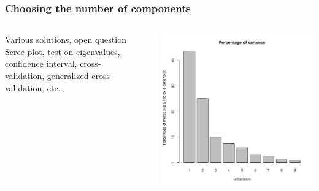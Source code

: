 \documentclass{beamer}\usepackage[]{graphicx}\usepackage[]{color}
\begin{document}
\begin{frame}
  \frametitle{Choosing the number of components}

  \begin{columns}
  \begin{column}{0.68\textwidth}
    \begin{block}{Various solutions, open question}
    Scree plot, test on eigenvalues, confidence interval, cross-validation, generalized cross-validation, etc.
    \end{block}
  \end{column}~~
  \begin{column}{0.3\textwidth}
    \includegraphics[width=\textwidth]{wine_pca_eig}
  \end{column}
  \end{columns}
  

\end{frame}
\end{document}
